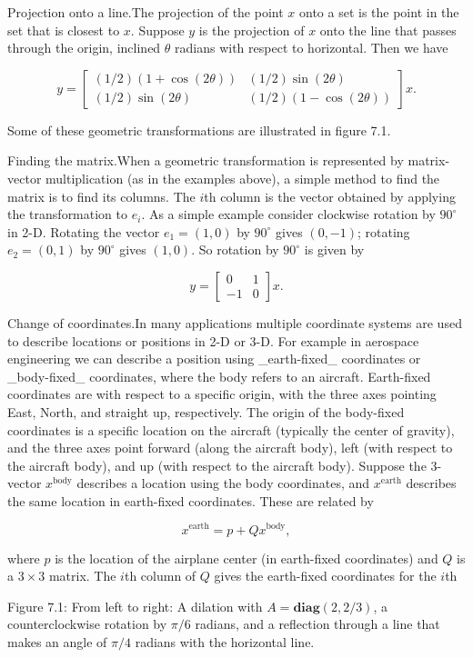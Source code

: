 
Projection onto a line.The projection of the point \(x\) onto a set is the point in the set that is closest to \(x\). Suppose \(y\) is the projection of \(x\) onto the line that passes through the origin, inclined \(\theta\) radians with respect to horizontal. Then we have

\[y=\left[\begin{array}{cc}(1/2)(1+\cos(2\theta))&(1/2)\sin(2\theta)\\ (1/2)\sin(2\theta)&(1/2)(1-\cos(2\theta))\end{array}\right]x.\]

Some of these geometric transformations are illustrated in figure 7.1.

Finding the matrix.When a geometric transformation is represented by matrix-vector multiplication (as in the examples above), a simple method to find the matrix is to find its columns. The \(i\)th column is the vector obtained by applying the transformation to \(e_{i}\). As a simple example consider clockwise rotation by \(90^{\circ}\) in 2-D. Rotating the vector \(e_{1}=(1,0)\) by \(90^{\circ}\) gives \((0,-1)\); rotating \(e_{2}=(0,1)\) by \(90^{\circ}\) gives \((1,0)\). So rotation by \(90^{\circ}\) is given by

\[y=\left[\begin{array}{cc}0&1\\ -1&0\end{array}\right]x.\]

Change of coordinates.In many applications multiple coordinate systems are used to describe locations or positions in 2-D or 3-D. For example in aerospace engineering we can describe a position using _earth-fixed_ coordinates or _body-fixed_ coordinates, where the body refers to an aircraft. Earth-fixed coordinates are with respect to a specific origin, with the three axes pointing East, North, and straight up, respectively. The origin of the body-fixed coordinates is a specific location on the aircraft (typically the center of gravity), and the three axes point forward (along the aircraft body), left (with respect to the aircraft body), and up (with respect to the aircraft body). Suppose the 3-vector \(x^{\text{body}}\) describes a location using the body coordinates, and \(x^{\text{earth}}\) describes the same location in earth-fixed coordinates. These are related by

\[x^{\text{earth}}=p+Qx^{\text{body}},\]

where \(p\) is the location of the airplane center (in earth-fixed coordinates) and \(Q\) is a \(3\times 3\) matrix. The \(i\)th column of \(Q\) gives the earth-fixed coordinates for the \(i\)th

Figure 7.1: From left to right: A dilation with \(A=\mathbf{diag}(2,2/3)\), a counterclockwise rotation by \(\pi/6\) radians, and a reflection through a line that makes an angle of \(\pi/4\) radians with the horizontal line.

 